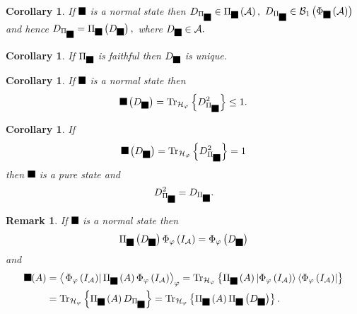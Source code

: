 \documentclass[aps,preprint]{revtex4}%
\providecommand{\U}[1]{\protect\rule{.1in}{.1in}}
\newtheorem{corollary}[theorem]{Corollary}
\newtheorem{remark}[theorem]{Remark}
\begin{document}
\begin{corollary}
If $\U{3c6} $ is a normal state then $D_{\Pi_{\U{3c6} }}\in\Pi_{\U{3c6}
}\left(  \mathcal{A}\right)  ,$ $D_{\Pi_{\U{3c6} }}\in\mathcal{B}_{1}\left(
\Phi_{\U{3c6} }\left(  \mathcal{A}\right)  \right)  $ and hence $D_{\Pi
_{\U{3c6} }}=\Pi_{\U{3c6} }\left(  D_{\U{3c6} }\right)  ,$ where $D_{\U{3c6}
}\in\mathcal{A}.$
\end{corollary}

\begin{corollary}
If $\Pi_{\U{3c6} }$ is faithful then $D_{\U{3c6} }$ is unique.
\end{corollary}

\begin{corollary}
If $\U{3c6} $ is a normal state then%
\begin{equation}
\U{3c6} \left(  D_{\U{3c6} }\right)  =\operatorname{Tr}_{\mathcal{H}_{\varphi
}}\left\{  D_{\Pi_{\U{3c6} }}^{2}\right\}  \leq1.
\end{equation}

\end{corollary}

\begin{corollary}
If
\begin{equation}
\U{3c6} \left(  D_{\U{3c6} }\right)  =\operatorname{Tr}_{\mathcal{H}_{\varphi
}}\left\{  D_{\Pi_{\U{3c6} }}^{2}\right\}  =1
\end{equation}
then $\U{3c6} $ is a pure state and
\begin{equation}
D_{\Pi_{\U{3c6} }}^{2}=D_{\Pi_{\U{3c6} }}.
\end{equation}

\end{corollary}

\begin{remark}
If $\U{3c6} $ is a normal state then%
\begin{equation}
\Pi_{\U{3c6} }\left(  D_{\U{3c6} }\right)  \Phi_{\varphi}\left(
I_{\mathcal{A}}\right)  =\Phi_{\varphi}\left(  D_{\U{3c6} }\right)
\end{equation}
and%
\begin{align}
\U{3c6} (A)  &  =\left\langle \left.  \Phi_{\varphi}\left(  I_{\mathcal{A}%
}\right)  \right\vert \Pi_{\U{3c6} }\left(  A\right)  \Phi_{\varphi}\left(
I_{\mathcal{A}}\right)  \right\rangle _{\varphi}=\operatorname{Tr}%
_{\mathcal{H}_{\varphi}}\left\{  \Pi_{\U{3c6} }\left(  A\right)  \left\vert
\Phi_{\varphi}\left(  I_{\mathcal{A}}\right)  \right\rangle \left\langle
\Phi_{\varphi}\left(  I_{\mathcal{A}}\right)  \right\vert \right\} \\
&  =\operatorname{Tr}_{\mathcal{H}_{\varphi}}\left\{  \Pi_{\U{3c6} }\left(
A\right)  D_{\Pi_{\U{3c6} }}\right\}  =\operatorname{Tr}_{\mathcal{H}%
_{\varphi}}\left\{  \Pi_{\U{3c6} }\left(  A\right)  \Pi_{\U{3c6} }\left(
D_{\U{3c6} }\right)  \right\}  .
\end{align}

\end{remark}
\end{document}

